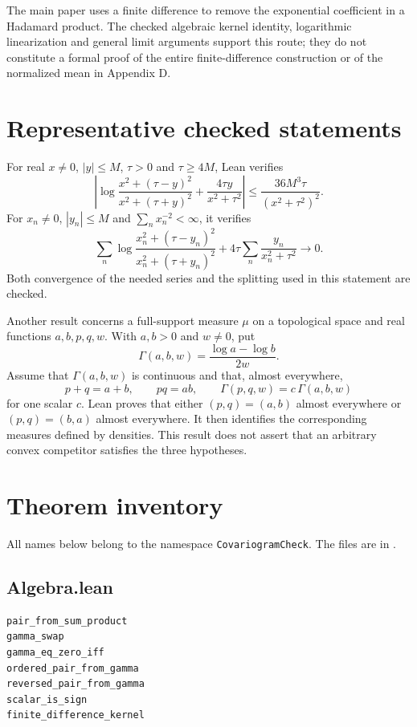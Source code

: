 \documentclass[11pt,a4paper]{article}
\begin{document}
The main paper uses a finite difference to remove the exponential
coefficient in a Hadamard product. The checked algebraic kernel identity,
logarithmic linearization and general limit arguments support this route;
they do not constitute a formal proof of the entire finite-difference
construction or of the normalized mean in Appendix D.

\section{Representative checked statements}
For real $x\ne0$, $|y|\le M$, $\tau>0$ and $\tau\ge4M$, Lean verifies
\[
 \left|\log\frac{x^2+(\tau-y)^2}{x^2+(\tau+y)^2}
             +\frac{4\tau y}{x^2+\tau^2}\right|
 \le\frac{36M^3\tau}{(x^2+\tau^2)^2}.
\]
For $x_n\ne0$, $|y_n|\le M$ and $\sum_nx_n^{-2}<\infty$, it verifies
\[
 \sum_n\log\frac{x_n^2+(\tau-y_n)^2}{x_n^2+(\tau+y_n)^2}
       +4\tau\sum_n\frac{y_n}{x_n^2+\tau^2}\longrightarrow0.
\]
Both convergence of the needed series and the splitting used in this
statement are checked.

Another result concerns a full-support measure $\mu$ on a topological
space and real functions $a,b,p,q,w$. With $a,b>0$ and $w\ne0$, put
\[
 \Gamma(a,b,w)=\frac{\log a-\log b}{2w}.
\]
Assume that $\Gamma(a,b,w)$ is continuous and that, almost everywhere,
\[
 p+q=a+b,\qquad pq=ab,\qquad
 \Gamma(p,q,w)=c\,\Gamma(a,b,w)
\]
for one scalar $c$. Lean proves that either $(p,q)=(a,b)$ almost
everywhere or $(p,q)=(b,a)$ almost everywhere. It then identifies the
corresponding measures defined by densities. This result does not assert
that an arbitrary convex competitor satisfies the three hypotheses.

\section{Theorem inventory}
All names below belong to the namespace \texttt{CovariogramCheck}.
The files are in .

\subsection*{Algebra.lean}
{\small\begin{verbatim}
pair_from_sum_product
gamma_swap
gamma_eq_zero_iff
ordered_pair_from_gamma
reversed_pair_from_gamma
scalar_is_sign
finite_difference_kernel
\end{verbatim}}
\end{document}
